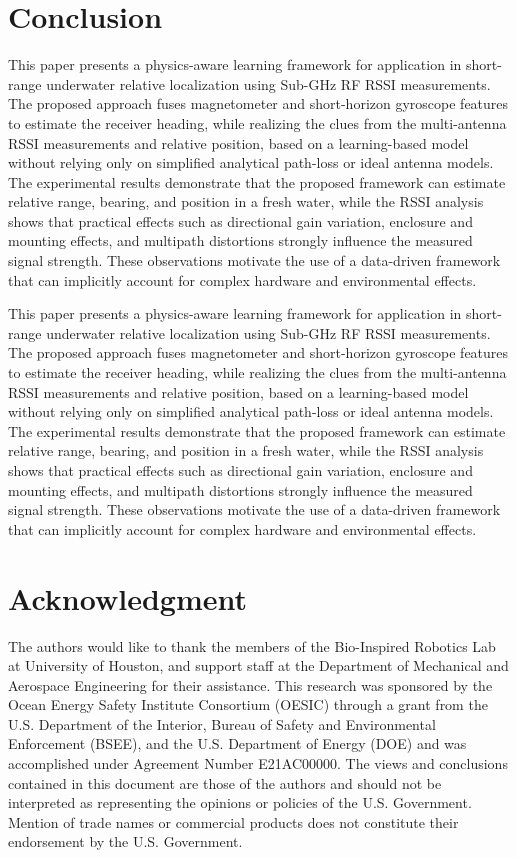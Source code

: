 \documentclass[subscriptcorrection,upint,varvw,barcolor=Goldenrod3,mathalfa=cal=euler,balance,hyphenate,pdf-a]{asmejour}
\begin{document}
\section{Conclusion}
This paper presents a physics-aware learning framework for application in short-range underwater relative localization using Sub-GHz RF RSSI measurements. The proposed approach fuses magnetometer and short-horizon gyroscope features to estimate the receiver heading, while realizing the clues from the multi-antenna RSSI measurements and relative position, based on a learning-based model without relying only on simplified analytical path-loss or ideal antenna models. The experimental results demonstrate that the proposed framework can estimate relative range, bearing, and position in a fresh water, while the RSSI analysis shows that practical effects such as directional gain variation, enclosure and mounting effects, and multipath distortions strongly influence the measured signal strength. These observations motivate the use of a data-driven framework that can implicitly account for complex hardware and environmental effects.

This paper presents a physics-aware learning framework for application in short-range underwater relative localization using Sub-GHz RF RSSI measurements. The proposed approach fuses magnetometer and short-horizon gyroscope features to estimate the receiver heading, while realizing the clues from the multi-antenna RSSI measurements and relative position, based on a learning-based model without relying only on simplified analytical path-loss or ideal antenna models. The experimental results demonstrate that the proposed framework can estimate relative range, bearing, and position in a fresh water, while the RSSI analysis shows that practical effects such as directional gain variation, enclosure and mounting effects, and multipath distortions strongly influence the measured signal strength. These observations motivate the use of a data-driven framework that can implicitly account for complex hardware and environmental effects.

\section*{Acknowledgment}
The authors would like to thank the members of the Bio-Inspired Robotics Lab at University of Houston, and support staff at the Department of Mechanical and Aerospace Engineering for their assistance. This research was sponsored by the Ocean Energy Safety Institute Consortium (OESIC) through a grant from the U.S. Department of the Interior, Bureau of Safety and Environmental Enforcement (BSEE), and the U.S. Department of Energy (DOE) and was accomplished under Agreement Number E21AC00000. The views and conclusions contained in this document are those of the authors and should not be interpreted as representing the opinions or policies of the U.S. Government. Mention of trade names or commercial products does not constitute their endorsement by the U.S. Government.
\end{document}
